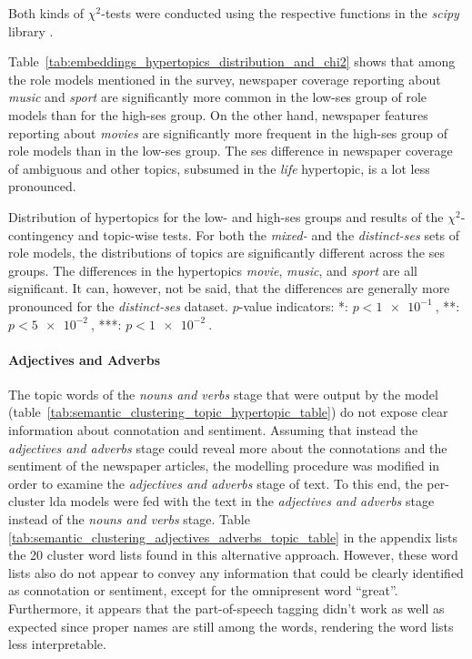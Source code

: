 Both kinds of $\chi^2$-tests were conducted using the respective functions in the \textit{scipy} library \autocite{scipychi2_scipy_nodate,scipychi2_contingency_scipy_nodate}.

Table~\ref{tab:embeddings_hypertopics_distribution_and_chi2} shows that among the role models mentioned in the survey, newspaper coverage reporting about \textit{music} and \textit{sport} are significantly more common in the low-\gls{ses} group of role models than for the high-\gls{ses} group. On the other hand, newspaper features reporting about \textit{movies} are significantly more frequent in the high-\gls{ses} group of role models than in the low-\gls{ses} group. The \gls{ses} difference in newspaper coverage of ambiguous and other topics, subsumed in the \textit{life} hypertopic, is a lot less pronounced.

\begin{table}
    \centering
    
    \caption{Distribution of hypertopics for the low- and high-\gls{ses} groups and results of the $\chi^2$-contingency and topic-wise tests. For both the \textit{mixed-} and the \textit{distinct-\gls{ses}} sets of role models, the distributions of topics are significantly different across the \gls{ses} groups. The differences in the hypertopics \textit{movie}, \textit{music}, and \textit{sport} are all significant. It can, however, not be said, that the differences are generally more pronounced for the \textit{distinct-\gls{ses}} dataset. $p$-value indicators: *: $p < \SI{1e-1}{}$, **: $p<\SI{5e-2}{}$, ***: $p<\SI{1e-2}{}$.}\label{tab:embeddings_hypertopics_distribution_and_chi2}
\end{table}

\paragraph{Adjectives and Adverbs}
The topic words of the \textit{nouns and verbs} stage that were output by the model (table~\ref{tab:semantic_clustering_topic_hypertopic_table}) do not expose clear information about connotation and sentiment. Assuming that instead the \textit{adjectives and adverbs} stage could reveal more about the connotations and the sentiment of the newspaper articles, the modelling procedure was modified in order to examine the \textit{adjectives and adverbs} stage of text. To this end, the per-cluster \gls{lda} models were fed with the text in the \textit{adjectives and adverbs} stage instead of the \textit{nouns and verbs} stage. Table \ref{tab:semantic_clustering_adjectives_adverbs_topic_table} in the appendix lists the \SI{20}{} cluster word lists found in this alternative approach. However, these word lists also do not appear to convey any information that could be clearly identified as connotation or sentiment, except for the omnipresent word ``great''. Furthermore, it appears that the part-of-speech tagging didn't work as well as expected since proper names are still among the words, rendering the word lists less interpretable.


